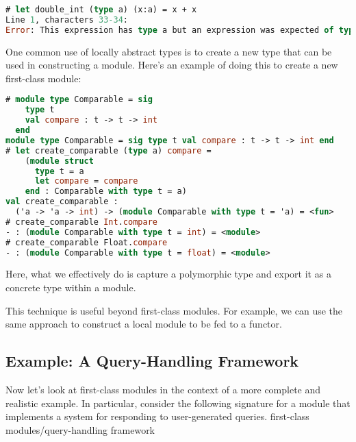 \begin{lstlisting}[language=Caml]
# let double_int (type a) (x:a) = x + x
Line 1, characters 33-34:
Error: This expression has type a but an expression was expected of type int
\end{lstlisting}

One common use of locally abstract types is to create a new type that
can be used in constructing a module. Here's an example of doing this to
create a new first-class module:

\begin{lstlisting}[language=Caml]
# module type Comparable = sig
    type t
    val compare : t -> t -> int
  end
module type Comparable = sig type t val compare : t -> t -> int end
# let create_comparable (type a) compare =
    (module struct
      type t = a
      let compare = compare
    end : Comparable with type t = a)
val create_comparable :
  ('a -> 'a -> int) -> (module Comparable with type t = 'a) = <fun>
# create_comparable Int.compare
- : (module Comparable with type t = int) = <module>
# create_comparable Float.compare
- : (module Comparable with type t = float) = <module>
\end{lstlisting}

Here, what we effectively do is capture a polymorphic type and export it
as a concrete type within a module.

This technique is useful beyond first-class modules. For example, we can
use the same approach to construct a local module to be fed to a
functor. ~

\hypertarget{example-a-query-handling-framework}{%
\subsection{Example: A Query-Handling
Framework}\label{example-a-query-handling-framework}}

Now let's look at first-class modules in the context of a more complete
and realistic example. In particular, consider the following signature
for a module that implements a system for responding to user-generated
queries.
\protect\hypertarget{FCMquery}{}{first-class
modules/query-handling framework}

